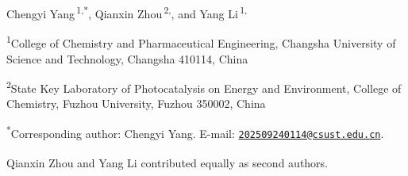 {\normalsize Chengyi Yang\,\textsuperscript{1,*}, Qianxin Zhou\,\textsuperscript{2,\textdagger}, and Yang Li\,\textsuperscript{1,\textdagger}\par}
\vspace{0.4em}
{\small \textsuperscript{1}College of Chemistry and Pharmaceutical Engineering, Changsha University of Science and Technology, Changsha 410114, China\par
\textsuperscript{2}State Key Laboratory of Photocatalysis on Energy and Environment, College of Chemistry, Fuzhou University, Fuzhou 350002, China\par}
\vspace{0.3em}
{\footnotesize \textsuperscript{*}Corresponding author: Chengyi Yang. E-mail: \href{mailto:202509240114@csust.edu.cn}{\nolinkurl{202509240114@csust.edu.cn}}.\par}
{\footnotesize \textsuperscript{\textdagger}Qianxin Zhou and Yang Li contributed equally as second authors.\par}
